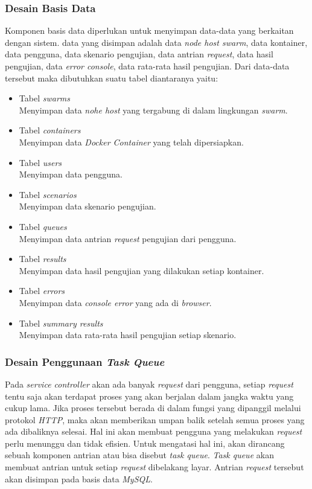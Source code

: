 	   		\subsubsection{Desain Basis Data}
	   			Komponen basis data diperlukan untuk menyimpan data-data yang berkaitan dengan sistem. data yang disimpan adalah data \textit{node host swarm}, data kontainer, data pengguna, data skenario pengujian, data antrian \textit{request}, data hasil pengujian, data \textit{error console}, data rata-rata hasil pengujian. Dari data-data tersebut maka dibutuhkan suatu tabel diantaranya yaitu:
	   			\begin{itemize}
	   				\item Tabel \textit{swarms} \\
	   					Menyimpan data \textit{nohe host} yang tergabung di dalam lingkungan \textit{swarm}.
	   				\item Tabel \textit{containers} \\
	   					Menyimpan data \textit{Docker Container} yang telah dipersiapkan.
	   				\item Tabel \textit{users} \\
	   					Menyimpan data pengguna.
	   				\item Tabel \textit{scenarios} \\
	   					Menyimpan data skenario pengujian.
	   				\item Tabel \textit{queues} \\
		   				Menyimpan data antrian \textit{request} pengujian dari pengguna.
	   				\item Tabel \textit{results} \\
	   					Menyimpan data hasil pengujian yang dilakukan setiap kontainer.
	   				\item Tabel \textit{errors} \\
	   					Menyimpan data \textit{console error} yang ada di \textit{browser}.
	   				\item Tabel \textit{summary results} \\
	   					Menyimpan data rata-rata hasil pengujian setiap skenario.
	   			\end{itemize}
	    		
	    	\subsubsection{Desain Penggunaan \textit{Task Queue}}
	    		Pada \textit{service controller} akan ada banyak \textit{request} dari pengguna, setiap \textit{request} tentu saja akan terdapat proses yang akan berjalan dalam jangka waktu yang cukup lama. Jika proses tersebut berada di dalam fungsi yang dipanggil melalui protokol \textit{HTTP}, maka akan memberikan umpan balik setelah semua proses yang ada dibaliknya selesai. Hal ini akan membuat pengguna yang melakukan \textit{request} perlu menunggu dan tidak efisien. Untuk mengatasi hal ini, akan dirancang sebuah komponen antrian atau bisa disebut \textit{task queue}. \textit{Task queue} akan membuat antrian untuk setiap \textit{request} dibelakang layar. Antrian \textit{request} tersebut akan disimpan pada basis data \textit{MySQL}.